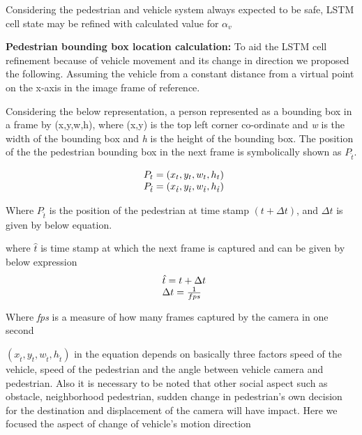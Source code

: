 Considering the pedestrian and vehicle system always expected to be safe, LSTM cell state may be refined with calculated value for $\alpha_v$

\newpara
\textbf{Pedestrian bounding box location calculation:}
To aid the LSTM cell refinement because of vehicle movement and its change in direction we proposed the following. Assuming the vehicle from a constant distance from a virtual point on the x-axis in the image frame of reference.

Considering the below representation, a person represented as a bounding box in a frame by (x,y,w,h), where (x,y) is the top left corner co-ordinate and \textit{w} is the width of the bounding box and \textit{h} is the height of the bounding box. The position of the the pedestrian bounding box in the next frame is symbolically shown as ${P}_{\hat{t}}$.

\begin{equation}
\begin{array}{l@{}}
{P}_{t}=(x_t,y_t,w_t,h_t) \\
{P}_{\hat{t}}=(x_{\hat{t}},y_{\hat{t}},w_{\hat{t}},h_{\hat{t}})
\end{array}
\end{equation}

Where ${P}_{\hat{t}}$ is the position of the pedestrian at time stamp $(t+\Delta t)$, and $\Delta t$ is given by below equation.

where $\hat{t}$ is time stamp at which the next frame is captured and can be given by below expression
\begin{equation}
\begin{array}{l@{}}
\hat{t} = t +  \Delta t \\
\Delta t = \frac{1}{fps}
\end{array}
\end{equation}

Where \textit{fps} is a measure of how many frames captured by the camera in one second

$(x_{\hat{t}},y_{\hat{t}},w_{\hat{t}},h_{\hat{t}})$ in the equation depends on basically three factors speed of the vehicle, speed of the pedestrian and the angle between vehicle camera and pedestrian. Also it is necessary to be noted that other social aspect such as obstacle, neighborhood pedestrian, sudden change in pedestrian's own decision for the destination and displacement of the camera will have impact.
Here we focused the aspect of change of vehicle's motion direction 


